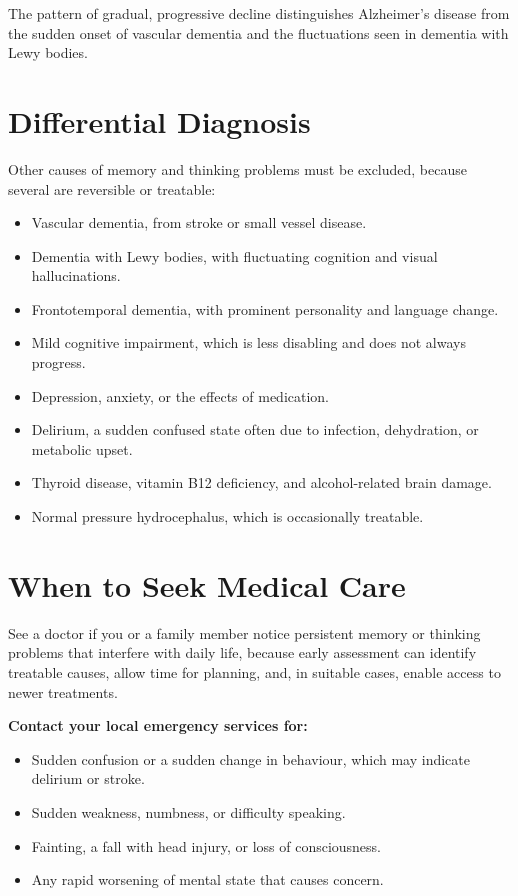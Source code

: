 The pattern of gradual, progressive decline distinguishes Alzheimer's disease from the sudden onset of vascular dementia and the fluctuations seen in dementia with Lewy bodies.

\section*{Differential Diagnosis}
Other causes of memory and thinking problems must be excluded, because several are reversible or treatable:

\begin{itemize}
    \item Vascular dementia, from stroke or small vessel disease.
    \item Dementia with Lewy bodies, with fluctuating cognition and visual hallucinations.
    \item Frontotemporal dementia, with prominent personality and language change.
    \item Mild cognitive impairment, which is less disabling and does not always progress.
    \item Depression, anxiety, or the effects of medication.
    \item Delirium, a sudden confused state often due to infection, dehydration, or metabolic upset.
    \item Thyroid disease, vitamin B12 deficiency, and alcohol-related brain damage.
    \item Normal pressure hydrocephalus, which is occasionally treatable.
\end{itemize}

\section*{When to Seek Medical Care}
See a doctor if you or a family member notice persistent memory or thinking problems that interfere with daily life, because early assessment can identify treatable causes, allow time for planning, and, in suitable cases, enable access to newer treatments.

\textbf{Contact your local emergency services for:}
\begin{itemize}
    \item Sudden confusion or a sudden change in behaviour, which may indicate delirium or stroke.
    \item Sudden weakness, numbness, or difficulty speaking.
    \item Fainting, a fall with head injury, or loss of consciousness.
    \item Any rapid worsening of mental state that causes concern.
\end{itemize}

